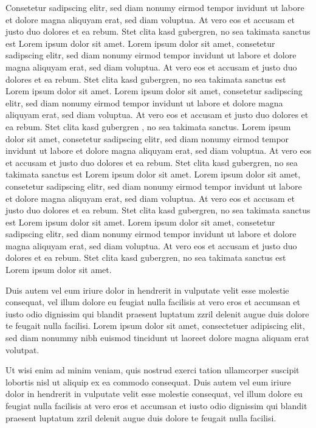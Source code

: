 Consetetur sadipscing elitr, sed diam nonumy eirmod tempor invidunt ut labore et dolore magna aliquyam erat, sed diam
voluptua. At vero eos et accusam et justo duo dolores et ea rebum. Stet clita kasd gubergren, no sea takimata sanctus
est Lorem ipsum dolor sit amet. Lorem ipsum dolor sit amet, consetetur sadipscing elitr, sed diam nonumy eirmod
tempor invidunt ut labore et dolore magna aliquyam erat, sed diam voluptua. At vero eos et accusam et justo duo
dolores et ea rebum. Stet clita kasd gubergren, no sea takimata sanctus est Lorem ipsum dolor sit amet. Lorem ipsum
dolor sit amet, consetetur sadipscing elitr, sed diam nonumy eirmod tempor invidunt ut labore et dolore magna
aliquyam erat, sed diam voluptua. At vero eos et accusam et justo duo dolores et ea rebum. Stet clita kasd gubergren
, no sea takimata sanctus. Lorem ipsum dolor sit amet, consetetur sadipscing elitr, sed diam nonumy eirmod tempor
invidunt ut labore et dolore magna aliquyam erat, sed diam voluptua. At vero eos et accusam et justo duo dolores et
ea rebum. Stet clita kasd gubergren, no sea takimata sanctus est Lorem ipsum dolor sit amet. Lorem ipsum dolor sit
amet, consetetur sadipscing elitr, sed diam nonumy eirmod tempor invidunt ut labore et dolore magna aliquyam erat,
sed diam voluptua. At vero eos et accusam et justo duo dolores et ea rebum. Stet clita kasd gubergren, no sea
takimata sanctus est Lorem ipsum dolor sit amet. Lorem ipsum dolor sit amet, consetetur sadipscing elitr, sed diam
nonumy eirmod tempor invidunt ut labore et dolore magna aliquyam erat, sed diam voluptua. At vero eos et accusam et
justo duo dolores et ea rebum. Stet clita kasd gubergren, no sea takimata sanctus est Lorem ipsum dolor sit amet.

Duis autem vel eum iriure dolor in hendrerit in vulputate velit esse molestie consequat, vel illum dolore eu feugiat
nulla facilisis at vero eros et accumsan et iusto odio dignissim qui blandit praesent luptatum zzril delenit augue
duis dolore te feugait nulla facilisi. Lorem ipsum dolor sit amet, consectetuer adipiscing elit, sed diam nonummy
nibh euismod tincidunt ut laoreet dolore magna aliquam erat volutpat.

Ut wisi enim ad minim veniam, quis nostrud exerci tation ullamcorper suscipit lobortis nisl ut aliquip ex ea commodo
consequat. Duis autem vel eum iriure dolor in hendrerit in vulputate velit esse molestie consequat, vel illum dolore
eu feugiat nulla facilisis at vero eros et accumsan et iusto odio dignissim qui blandit praesent luptatum zzril
delenit augue duis dolore te feugait nulla facilisi.

